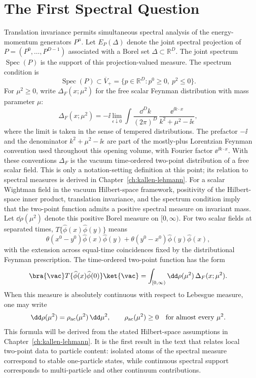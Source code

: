 \section{The First Spectral Question}

Translation invariance permits simultaneous spectral analysis of the
energy-momentum generators \(P^\mu\).  Let \(E_P(\Delta)\) denote the joint
spectral projection of \(P=(P^0,\ldots,P^{D-1})\) associated with a Borel set
\(\Delta\subset\mathbb R^D\).  The joint spectrum
\(\operatorname{Spec}(P)\) is the support of this projection-valued measure.
The spectrum condition is
\[
  \operatorname{Spec}(P)\subset
  \overline V_+
  =
  \{p\in\mathbb R^D:p^0\ge0,\ p^2\le0\}.
\]
For \(\mu^2\ge0\), write \(\Delta_F(x;\mu^2)\) for the free scalar Feynman
distribution with mass parameter \(\mu\):
\[
  \Delta_F(x;\mu^2)
  =
  -\ii\lim_{\epsilon\downarrow0}
  \int\frac{\dd^Dk}{(2\pi)^D}\,
  \frac{\ee^{\ii k\cdot x}}{k^2+\mu^2-\ii\epsilon},
\]
where the limit is taken in the sense of tempered distributions.  The
prefactor \(-\ii\) and the denominator \(k^2+\mu^2-\ii\epsilon\) are part of
the mostly-plus Lorentzian Feynman convention used throughout this opening
volume, with Fourier factor \(\ee^{\ii k\cdot x}\).  With these conventions
\(\Delta_F\) is the vacuum time-ordered two-point distribution of a free
scalar field.  This is only a notation-setting definition at this point; its
relation to spectral measures is derived in Chapter~\ref{ch:kallen-lehmann}.
For a scalar Wightman field in the vacuum Hilbert-space framework, positivity
of the Hilbert-space inner product, translation invariance, and the spectrum
condition imply that the two-point function admits a positive spectral
measure on invariant mass.  Let \(\dd\rho(\mu^2)\) denote this positive Borel
measure on \([0,\infty)\).  For two scalar fields at separated times,
\(T\{\widehat\phi(x)\widehat\phi(y)\}\) means
\[
  \theta(x^0-y^0)\widehat\phi(x)\widehat\phi(y)
  +
  \theta(y^0-x^0)\widehat\phi(y)\widehat\phi(x),
\]
with the extension across equal-time coincidences fixed by the distributional
Feynman prescription.  The time-ordered two-point function has the form
\[
  \bra{\vac}T\{\widehat\phi(x)\widehat\phi(0)\}\ket{\vac}
  =
  \int_{[0,\infty)} \dd\rho(\mu^2)\,\Delta_F(x;\mu^2).
\]
When this measure is absolutely continuous with respect to Lebesgue measure,
one may write
\[
  \dd\rho(\mu^2)=\rho_{\rm ac}(\mu^2)\,\dd\mu^2,
  \qquad
  \rho_{\rm ac}(\mu^2)\ge0
  \quad\text{for almost every }\mu^2 .
\]
This formula will be derived from the stated Hilbert-space assumptions in
Chapter~\ref{ch:kallen-lehmann}.  It is the first result in the text that
relates local two-point data to particle content: isolated atoms of the spectral
measure correspond to stable one-particle states, while continuous spectral
support corresponds to multi-particle and other continuum contributions.

